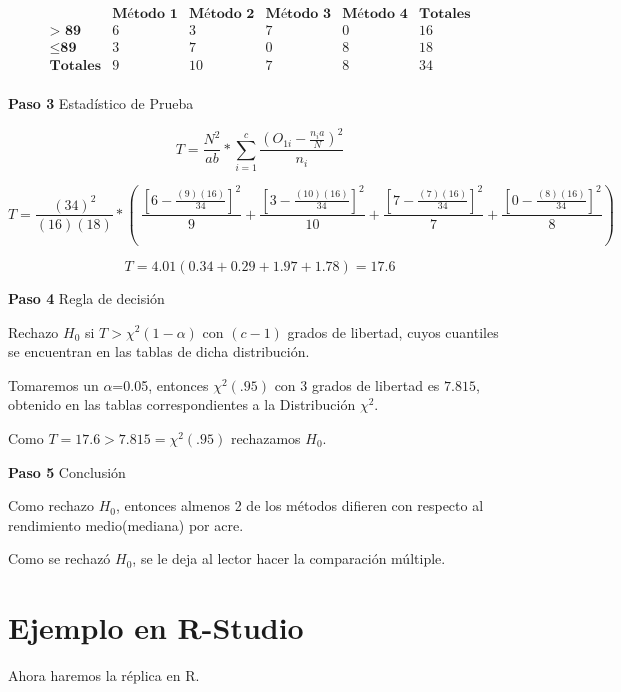 \documentclass[
  a4paper,
  oneside,
  openany]{book}
\begin{document}
\[
\begin{array}{c|c|c|c|c|c}
 & \textbf{Método 1} & \textbf{Método 2} & \textbf{Método 3} & \textbf{Método 4}& \textbf{Totales} \\
\hline
\textbf{> 89} & 6 & 3 & 7 & 0 & 16  \\
\hline
\leq \textbf{89} & 3 & 7 & 0 & 8 & 18\\
\hline
\textbf{Totales}  & 9  & 10  & 7 & 8  & 34 \\
\end{array}
\]

\textbf{Paso 3} Estadístico de Prueba

\[T=\frac{N^2}{ab}*\sum^{c}_{i=1}\frac{(O_{1i}-\frac{n_{i}a}{N})^2}{n_i}\]

\[T=\frac{(34)^2}{(16)(18)}*\left(\ \frac{\left[6-\frac{(9)(16)}{34}\right]^2}{9}+\frac{\left[3-\frac{(10)(16)}{34}\right]^2}{10}+\frac{\left[7-\frac{(7)(16)}{34}\right]^2}{7}+\frac{\left[0-\frac{(8)(16)}{34}\right]^2}{8} \right)\]

\[T=4.01(0.34+0.29+1.97+1.78) = 17.6\]

\textbf{Paso 4} Regla de decisión

Rechazo \(H_0\) si \(T> \chi^2(1-\alpha)\) con \((c-1)\) grados de libertad, cuyos cuantiles se encuentran en las tablas de dicha distribución.

Tomaremos un \(\alpha\)=0.05, entonces \(\chi^2(.95)\) con 3 grados de libertad es \(7.815\), obtenido en las tablas correspondientes a la Distribución \(\chi^2\).

Como \(T=17.6 > 7.815=\chi^2(.95)\) rechazamos \(H_0\).

\textbf{Paso 5} Conclusión

Como rechazo \(H_0\), entonces almenos 2 de los métodos difieren con respecto al rendimiento medio(mediana) por acre.

Como se rechazó \(H_0\), se le deja al lector hacer la comparación múltiple.

\hypertarget{ejemplo-en-r-studio-12}{%
\section{Ejemplo en R-Studio}\label{ejemplo-en-r-studio-12}}

Ahora haremos la réplica en R.
\end{document}

